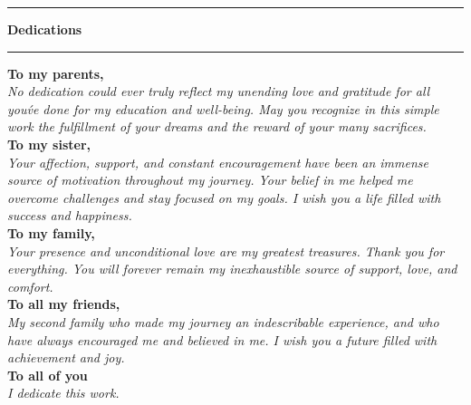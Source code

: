 \begingroup
{}

\noindent
\begin{minipage}{0.06\textwidth}
	\vspace{0.1cm}
	{\color{black}\rule{\linewidth}{1.4cm}}
\end{minipage}%
\hfill
\begin{minipage}{0.88\textwidth}
	{\raggedright\LARGE\bfseries Dedications\\[6pt]}
	\noindent\rule{0.95\linewidth}{0.5pt}
\end{minipage}

\vspace{1.8cm}

\begin{center}
	\begin{minipage}{0.75\textwidth}
		\centering
		\fontsize{12pt}{20pt}\selectfont
		{\bfseries To my parents,}\\[10pt]
		{\itshape No dedication could ever truly reflect my unending love and gratitude for all you\'ve done for my education and well-being. May you recognize in this simple work the fulfillment of your dreams and the reward of your many sacrifices.}\\[16pt]

		{\bfseries\hspace{6mm}To my sister,\hspace{6mm}}\\[10pt]
		{\itshape Your affection, support, and constant encouragement have been an immense source of motivation throughout my journey. Your belief in me helped me overcome challenges and stay focused on my goals. I wish you a life filled with success and happiness.}\\[16pt]

		{\bfseries\hspace{6mm}To my family,\hspace{6mm}}\\[10pt]
		{\itshape Your presence and unconditional love are my greatest treasures. Thank you for everything. You will forever remain my inexhaustible source of support, love, and comfort.}\\[16pt]

		{\bfseries\hspace{6mm}To all my friends,\hspace{6mm}}\\[10pt]
		{\itshape My second family who made my journey an indescribable experience, and who have always encouraged me and believed in me. I wish you a future filled with achievement and joy.}\\[20pt]

		{\bfseries\hspace{6mm}To all of you\hspace{6mm}}\\[8pt]
		{\large\itshape I dedicate this work.}
	\end{minipage}
\end{center}
\endgroup


